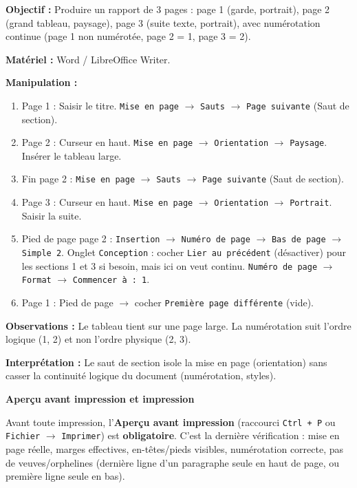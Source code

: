 \documentclass[11pt]{article}
\begin{document}
\begin{experience}
    \textbf{Objectif :} Produire un rapport de 3 pages : page 1 (garde, portrait), page 2 (grand tableau, paysage), page 3 (suite texte, portrait), avec numérotation continue (page 1 non numérotée, page 2 = 1, page 3 = 2).
    
    \textbf{Matériel :} Word / LibreOffice Writer.
    
    \textbf{Manipulation :}
    \begin{enumerate}
        \item Page 1 : Saisir le titre. \texttt{Mise en page} $\rightarrow$ \texttt{Sauts} $\rightarrow$ \texttt{Page suivante} (Saut de section).
        \item Page 2 : Curseur en haut. \texttt{Mise en page} $\rightarrow$ \texttt{Orientation} $\rightarrow$ \texttt{Paysage}. Insérer le tableau large.
        \item Fin page 2 : \texttt{Mise en page} $\rightarrow$ \texttt{Sauts} $\rightarrow$ \texttt{Page suivante} (Saut de section).
        \item Page 3 : Curseur en haut. \texttt{Mise en page} $\rightarrow$ \texttt{Orientation} $\rightarrow$ \texttt{Portrait}. Saisir la suite.
        \item Pied de page page 2 : \texttt{Insertion} $\rightarrow$ \texttt{Numéro de page} $\rightarrow$ \texttt{Bas de page} $\rightarrow$ \texttt{Simple 2}. Onglet \texttt{Conception} : cocher \texttt{Lier au précédent} (désactiver) pour les sections 1 et 3 si besoin, mais ici on veut continu. \texttt{Numéro de page} $\rightarrow$ \texttt{Format} $\rightarrow$ \texttt{Commencer à : 1}.
        \item Page 1 : Pied de page $\rightarrow$ cocher \texttt{Première page différente} (vide).
    \end{enumerate}
    
    \textbf{Observations :} Le tableau tient sur une page large. La numérotation suit l'ordre logique (1, 2) et non l'ordre physique (2, 3).
    
    \textbf{Interprétation :} Le saut de section isole la mise en page (orientation) sans casser la continuité logique du document (numérotation, styles).
\end{experience}

\textbf{Aperçu avant impression et impression}\par

Avant toute impression, l'\textbf{Aperçu avant impression} (raccourci \texttt{Ctrl + P} ou \texttt{Fichier} $\rightarrow$ \texttt{Imprimer}) est \textbf{obligatoire}. C'est la dernière vérification : mise en page réelle, marges effectives, en-têtes/pieds visibles, numérotation correcte, pas de veuves/orphelines (dernière ligne d'un paragraphe seule en haut de page, ou première ligne seule en bas).
\end{document}
